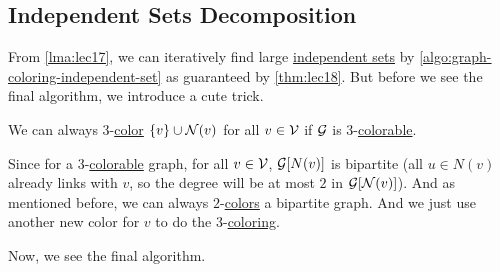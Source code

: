 \subsection{Independent Sets Decomposition}
From \autoref{lma:lec17}, we can iteratively find large \hyperref[def:independent-set]{independent sets} by \autoref{algo:graph-coloring-independent-set} as guaranteed by \autoref{thm:lec18}. But before we see the final algorithm, we introduce a cute trick.

\begin{remark}\label{rmk:Wigderson-trick}
	We can always \(3\)-\hyperref[def:coloring]{color} \(\left\{ v \right\} \cup \mathcal{\MakeUppercase{n}} (v)\) for all \(v\in \mathcal{\MakeUppercase{v}} \) if \(\mathcal{\MakeUppercase{g}} \) is \(3\)-\hyperref[def:coloring]{colorable}.
\end{remark}
\begin{explanation}
	Since for a \(3\)-\hyperref[def:coloring]{colorable} graph, for all \(v\in \mathcal{\MakeUppercase{v}} \), \(\mathcal{\MakeUppercase{g}} [N(v)]\) is bipartite (all \(u\in N(v)\) already links with \(v\), so the degree will be at most \(2\) in \(\mathcal{\MakeUppercase{g}} [\mathcal{\MakeUppercase{n}} (v)]\)). And as mentioned before, we can always \(2\)-\hyperref[def:coloring]{colors} a bipartite graph. And we just use another new color for \(v\) to do the \(3\)-\hyperref[def:coloring]{coloring}.
\end{explanation}

Now, we see the final algorithm.


